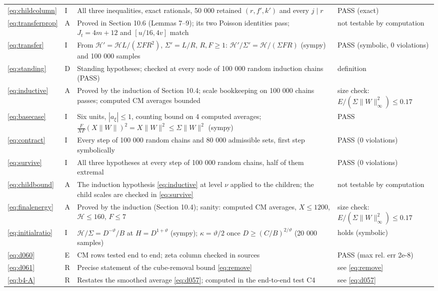 \documentclass[11pt]{article}
\numberwithin{equation}{section}
\begin{document}
\begin{longtable}{@{}>{\raggedright\arraybackslash}p{1.2cm}>{\centering\arraybackslash}p{0.7cm}>{\raggedright\arraybackslash}p{9.05cm}>{\raggedright\arraybackslash}p{4.3cm}@{}}
\eqref{eq:childcolumn} & I & All three inequalities, exact rationals, 50 000 retained $(r,f',k')$ and every $j\mid r$ & PASS (exact)\\
\eqref{eq:transferprop} & A & Proved in Section 10.6 (Lemmas 7--9); its two Poisson identities pass; $J_t=4m+12$ and $[u/16,4v]$ match \cite[Proposition~5.4]{OAI1112} & not testable by computation\\
\eqref{eq:transfer} & I & From $\mathcal H'=\mathcal HL/(\Sigma FR^2)$, $\Sigma'=L/R$, $R,F\ge1$: $\mathcal H'/\Sigma'=\mathcal H/(\Sigma FR)$ (sympy) and 100 000 samples & PASS (symbolic, 0 violations)\\
\eqref{eq:standing} & D & Standing hypotheses; checked at every node of 100 000 random induction chains (PASS) & definition\\
\eqref{eq:inductive} & A & Proved by the induction of Section 10.4; scale bookkeeping on 100 000 chains passes; computed CM averages bounded & size check: $E/(\Sigma\|W\|_\infty^2)\le0.17$\\
\eqref{eq:basecase} & I & Six units, $|a_\xi|\le1$, counting bound on 4 computed averages; $\frac{F}{XF}(X\|W\|)^2=X\|W\|^2\le\Sigma\|W\|^2$ (sympy) & PASS\\
\eqref{eq:contract} & I & Every step of 100 000 random chains and 80 000 admissible sets, first step symbolically & PASS (0 violations)\\
\eqref{eq:survive} & I & All three hypotheses at every step of 100 000 random chains, half of them extremal & PASS (0 violations)\\
\eqref{eq:childbound} & A & The induction hypothesis \eqref{eq:inductive} at level $\nu$ applied to the children; the child scales are checked in \eqref{eq:survive} & not testable by computation\\
\eqref{eq:finalenergy} & A & Proved by the induction (Section 10.4); sanity: computed CM averages, $X\le1200$, $\mathcal H\le160$, $F\le7$ & size check: $E/(\Sigma\|W\|_\infty^2)\le0.17$\\
\eqref{eq:initialratio} & I & $\mathcal H/\Sigma=D^{-\vartheta}/B$ at $H=D^{1+\vartheta}$ (sympy); $\kappa=\vartheta/2$ once $D\ge(C/B)^{2/\vartheta}$ (20 000 samples) & holds (symbolic)\\
\eqref{eq:d060} & E & CM rows tested end to end; zeta column checked in sources & PASS (max rel. err 2e-8)\\
\eqref{eq:d061} & R & Precise statement of the cube-removal bound \eqref{eq:remove} & see \eqref{eq:remove}\\
\eqref{eq:b4-A} & R & Restates the smoothed average \eqref{eq:d057}; computed in the end-to-end test C4 & see \eqref{eq:d057}\\

\end{longtable}
\end{document}
